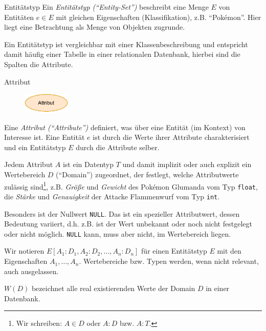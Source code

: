 \begin{defi}{Entitätstyp}
    Ein \emph{Entitätstyp (\enquote{Entity-Set})} beschreibt eine Menge $E$ von Entitäten $e \in E$ mit gleichen Eigenschaften (Klassifikation), z.B. \enquote{Pokémon}.
    Hier liegt eine Betrachtung als Menge von Objekten zugrunde.

    Ein Entitätstyp ist vergleichbar mit einer Klassenbeschreibung und entspricht damit häufig einer Tabelle in einer relationalen Datenbank, hierbei sind die Spalten die Attribute.
\end{defi}

\begin{defi}{Attribut}
    \begin{figure}
        \begin{center}
            \includegraphics[width=0.2\textwidth]{includes/figures/definition_entity_relationship_model_attribute.pdf}
        \end{center}
    \end{figure}
    Eine \emph{Attribut (\enquote{Attribute})} definiert, was über eine Entität (im Kontext) von Interesse ist.
    Eine Entität $e$ ist durch die Werte ihrer Attribute charakterisiert und ein Entitätstyp $E$ durch die Attribute selber.

    Jedem Attribut $A$ ist ein Datentyp $T$ und damit implizit oder auch explizit ein Wertebereich $D$ (\enquote{Domain}) zugeordnet, der festlegt, welche Attributwerte zulässig sind\footnote{Wir schreiben: $A \in D$ oder $A:D$ bzw. $A:T$.}, z.B. \emph{Größe} und \emph{Gewicht} des Pokémon Glumanda vom Typ \texttt{float}, die \emph{Stärke} und \emph{Genauigkeit} der Attacke Flammenwurf vom Typ \texttt{int}.

    Besonders ist der Nullwert \texttt{NULL}.
    Das ist ein spezieller Attributwert, dessen Bedeutung variiert, d.h. z.B. ist der Wert unbekannt oder noch nicht festgelegt oder nicht möglich.
    \texttt{NULL} kann, muss aber nicht, im Wertebereich liegen.

    Wir notieren $E[A_1 : D_1, A_2 : D_2, \ldots, A_n : D_n]$ für einen Entitätstyp $E$ mit den Eigenschaften $A_1, \ldots, A_n$.
    Wertebereiche bzw. Typen werden, wenn nicht relevant, auch ausgelassen.

    $W(D)$ bezeichnet alle real existierenden Werte der Domain $D$ in einer Datenbank.
\end{defi}

